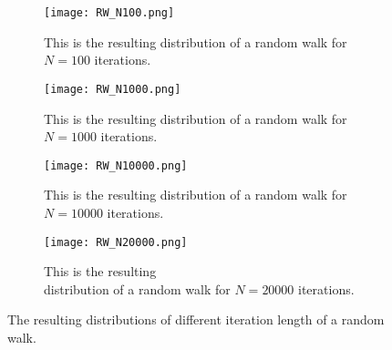 \documentclass{article}[a4paper]
\begin{document}
\begin{figure}
\centering
\begin{subfigure}{0.4\textwidth}
    \texttt{[image: RW\_N100.png]}
    \caption{This is the resulting distribution of a random walk for $N=100$ iterations.}
    \label{fig:first}
\end{subfigure}
\hfill
\begin{subfigure}{0.4\textwidth}
    \texttt{[image: RW\_N1000.png]}
    \caption{This is the resulting distribution of a random walk for\\ $N=1000$ iterations.}
    \label{fig:second}
\end{subfigure}
\hfill
\begin{subfigure}{0.4\textwidth}
    \texttt{[image: RW\_N10000.png]}
    \caption{This is the resulting distribution of a random walk for $N=10000$ iterations.}
    \label{fig:third}
\end{subfigure}
\hfill
\begin{subfigure}{0.4\textwidth}
    \texttt{[image: RW\_N20000.png]}
    \caption{This is the resulting\\ distribution of a random walk for $N=20000$ iterations.}
\end{subfigure}
\caption{The resulting distributions of different iteration length of a random walk.}
\label{fig:figures}
\end{figure}

\begin{figure}
    \centering
    \begin{subfigure}[position][height][inner pos]{width}
        
    \end{subfigure}
\end{figure}
\end{document}
